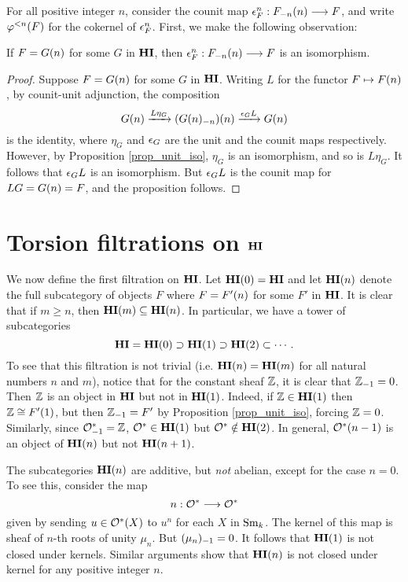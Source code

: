 For all positive integer $n$, consider the counit map $\cuHI_F^n: 
\LHI[n]{\RHI[n]{F}} \to F$, and write $\tlHI{n}(F)$ for the 
cokernel of $\cuHI_F^n$. First, we make the following observation:

\begin{prop}\label{prop_counit_iso_for_HIn}
If $F = \LHI[n]{G}$ for some $G$ in $\HI$, then $\cuHI^n_F : 
\LHI[n]{\RHI[n]{F}} \to F$ is an isomorphism.
\end{prop}
\begin{proof}
Suppose $F = \LHI[n]{G}$ for some $G$ in $\HI$. Writing $L$ for 
the functor 
$F \mapsto \LHI[n]F$, by counit-unit adjunction, the composition
\[
\LHI[n]{G} \xrightarrow{L\eta_G} \LHI[n]{(\RHI[n]{\LHI[n]{G}})}
   \xrightarrow{\cuHI_G L} \LHI[n]{G}
\]
is the identity, where $\eta_{G}$ and $\cuHI_{G}$ are the unit and 
the counit maps respectively. However, by Proposition \ref{prop_unit_iso}, 
$\eta_{G}$ is an isomorphism, and so is $L\eta_{G}$. It follows
that $\cuHI_G L$ is an isomorphism. But $\cuHI_G L$ is the counit
map for $LG = \LHI[n]{G} = F$, and the proposition follows.
\end{proof}

\section{Torsion filtrations on $\HI$}

We now define the first filtration on $\HI$. Let $\LHI[0]{\HI} = 
\HI$ and let $\LHI[n]{\HI}$ denote the full subcategory of objects 
$F$ where $F = \LHI[n]{F'}$ for some $F'$ in $\HI$. It is clear 
that if $m \geq n$, then $\LHI[m]{\HI} \subseteq \LHI[n]{\HI}$. 
In particular, we have a tower of subcategories
\[
\HI = \LHI[0]{\HI} \supset \LHI[1]{\HI} \supset \LHI[2]{\HI} 
\subset \cdots.
\]
To see that this filtration is not trivial (i.e. $\LHI[n]{\HI} =
\LHI[m]{\HI}$ for all natural numbers $n$ and $m$), notice that
for the constant sheaf $\Z$, it is clear that $\RHI{\Z} = 0$. 
Then $\Z$ is an object in $\HI$ but not in $\LHI{\HI}$. Indeed, if 
$\Z \in \LHI{\HI}$ then $\Z \cong \LHI{F'}$, but then $\RHI{\Z} = F'$ 
by Proposition \ref{prop_unit_iso}, forcing $\Z = 0$. Similarly, 
since $\RHI{\Ox} = \Z$, $\Ox \in \LHI{\HI}$ but $\Ox \notin
\LHI[2]{\HI}$. In general, $\LHI[n - 1]{\Ox}$ is an object of
$\LHI[n]{\HI}$ but not $\LHI[n + 1]{\HI}$.

\begin{rmk}
The subcategories $\LHI[n]{\HI}$ are additive, but \emph{not} 
abelian, except for the case $n = 0$. To see this, consider the 
map
\[
n: \Ox \to \Ox
\]
given by sending $u \in \Ox(X)$ to $u^n$ for each $X$ in $\Sm$.
The kernel of this map is sheaf of $n$-th roots of unity $\mu_n$.
But $\RHI{(\mu_n)} = 0$. It follows that $\LHI{\HI}$ is not closed
under kernels. Similar arguments show that $\LHI[n]{\HI}$ is
not closed under kernel for any positive integer $n$.
\end{rmk}

